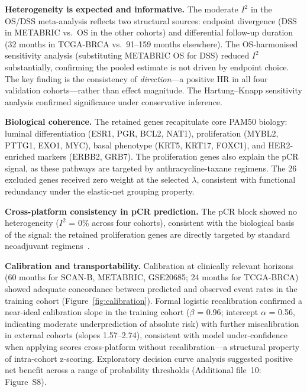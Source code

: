 \documentclass[referee,lineno,pdflatex,sn-vancouver-num]{sn-jnl}
\begin{document}
\textbf{Heterogeneity is expected and informative.} The moderate $I^2$ in the OS/DSS meta-analysis reflects two structural sources: endpoint divergence (DSS in METABRIC vs.\ OS in the other cohorts) and differential follow-up duration (32 months in TCGA-BRCA vs.\ 91--159 months elsewhere). The OS-harmonised sensitivity analysis (substituting METABRIC OS for DSS) reduced $I^2$ substantially, confirming the pooled estimate is not driven by endpoint choice. The key finding is the consistency of \textit{direction}---a positive HR in all four validation cohorts---rather than effect magnitude. The Hartung--Knapp sensitivity analysis confirmed significance under conservative inference.

\textbf{Biological coherence.} The retained genes recapitulate core PAM50 biology: luminal differentiation (ESR1, PGR, BCL2, NAT1), proliferation (MYBL2, PTTG1, EXO1, MYC), basal phenotype (KRT5, KRT17, FOXC1), and HER2-enriched markers (ERBB2, GRB7). The proliferation genes also explain the pCR signal, as these pathways are targeted by anthracycline-taxane regimens. The 26 excluded genes received zero weight at the selected $\lambda$, consistent with functional redundancy under the elastic-net grouping property.

\textbf{Cross-platform consistency in pCR prediction.} The pCR block showed no heterogeneity ($I^2$ = 0\% across four cohorts), consistent with the biological basis of the signal: the retained proliferation genes are directly targeted by standard neoadjuvant regimens~\cite{prat2015}.

\textbf{Calibration and transportability.} Calibration at clinically relevant horizons (60 months for SCAN-B, METABRIC, GSE20685; 24 months for TCGA-BRCA) showed adequate concordance between predicted and observed event rates in the training cohort (Figure~\ref{fig:calibration}). Formal logistic recalibration confirmed a near-ideal calibration slope in the training cohort ($\beta$ = 0.96; intercept $\alpha$ = 0.56, indicating moderate underprediction of absolute risk) with further miscalibration in external cohorts (slopes 1.57--2.74), consistent with model under-confidence when applying scores cross-platform without recalibration---a structural property of intra-cohort z-scoring. Exploratory decision curve analysis suggested positive net benefit across a range of probability thresholds (Additional file~10: Figure~S8).
\end{document}
